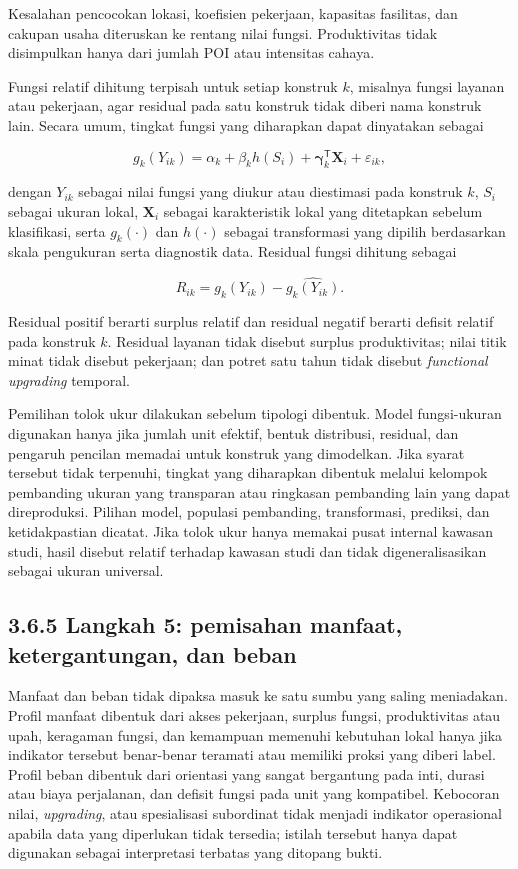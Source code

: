 \documentclass[
  indonesian,
  11pt,
  a4paper,
  oneside,
  openany]{report}
\begin{document}
Kesalahan pencocokan lokasi, koefisien pekerjaan, kapasitas fasilitas,
dan cakupan usaha diteruskan ke rentang nilai fungsi. Produktivitas
tidak disimpulkan hanya dari jumlah POI atau intensitas cahaya.

Fungsi relatif dihitung terpisah untuk setiap konstruk \(k\), misalnya
fungsi layanan atau pekerjaan, agar residual pada satu konstruk tidak
diberi nama konstruk lain. Secara umum, tingkat fungsi yang diharapkan
dapat dinyatakan sebagai

\[
g_k(Y_{ik}) = \alpha_k + \beta_k h(S_i) + \boldsymbol{\gamma}_k^{\mathsf T}\mathbf{X}_i + \varepsilon_{ik},
\]

dengan \(Y_{ik}\) sebagai nilai fungsi yang diukur atau diestimasi pada
konstruk \(k\), \(S_i\) sebagai ukuran lokal, \(\mathbf{X}_i\) sebagai
karakteristik lokal yang ditetapkan sebelum klasifikasi, serta
\(g_k(\cdot)\) dan \(h(\cdot)\) sebagai transformasi yang dipilih
berdasarkan skala pengukuran serta diagnostik data. Residual fungsi
dihitung sebagai

\[
R_{ik}=g_k(Y_{ik})-\widehat{g_k(Y_{ik})}.
\]

Residual positif berarti surplus relatif dan residual negatif berarti
defisit relatif pada konstruk \(k\). Residual layanan tidak disebut
surplus produktivitas; nilai titik minat tidak disebut pekerjaan; dan
potret satu tahun tidak disebut \emph{functional upgrading} temporal.

Pemilihan tolok ukur dilakukan sebelum tipologi dibentuk. Model
fungsi-ukuran digunakan hanya jika jumlah unit efektif, bentuk
distribusi, residual, dan pengaruh pencilan memadai untuk konstruk yang
dimodelkan. Jika syarat tersebut tidak terpenuhi, tingkat yang
diharapkan dibentuk melalui kelompok pembanding ukuran yang transparan
atau ringkasan pembanding lain yang dapat direproduksi. Pilihan model,
populasi pembanding, transformasi, prediksi, dan ketidakpastian dicatat.
Jika tolok ukur hanya memakai pusat internal kawasan studi, hasil
disebut relatif terhadap kawasan studi dan tidak digeneralisasikan
sebagai ukuran universal.

\subsection{3.6.5 Langkah 5: pemisahan manfaat, ketergantungan, dan
beban}\label{langkah-5-pemisahan-manfaat-ketergantungan-dan-beban}

Manfaat dan beban tidak dipaksa masuk ke satu sumbu yang saling
meniadakan. Profil manfaat dibentuk dari akses pekerjaan, surplus
fungsi, produktivitas atau upah, keragaman fungsi, dan kemampuan
memenuhi kebutuhan lokal hanya jika indikator tersebut benar-benar
teramati atau memiliki proksi yang diberi label. Profil beban dibentuk
dari orientasi yang sangat bergantung pada inti, durasi atau biaya
perjalanan, dan defisit fungsi pada unit yang kompatibel. Kebocoran
nilai, \emph{upgrading}, atau spesialisasi subordinat tidak menjadi
indikator operasional apabila data yang diperlukan tidak tersedia;
istilah tersebut hanya dapat digunakan sebagai interpretasi terbatas
yang ditopang bukti.
\end{document}
